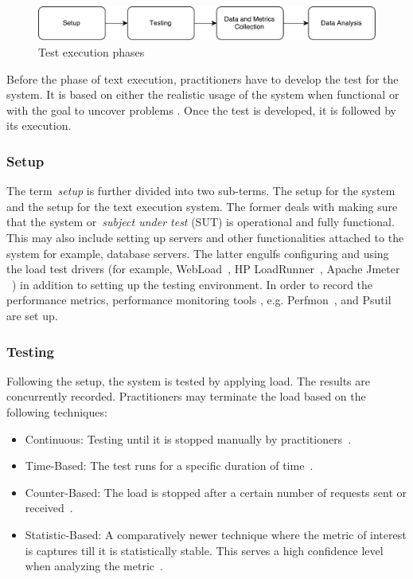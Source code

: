 \begin{figure}[thb!]
	\centering
	\includegraphics[width=1\textwidth]{figures/test_overview.pdf}
	\caption{Test execution phases}
	\label{fig:test_phases}
\end{figure}


Before the phase of text execution, practitioners have to develop the test for the system. It is based on either the realistic usage of the system when functional or with the goal to uncover problems \cite{jiang2015survey}.
Once the test is developed, it is followed by its execution. 



\subsubsection{Setup}


The term~\textit{setup} is further divided into two sub-terms. The setup for the system and the setup for the text execution system. The former deals with making sure that the system or~\textit{subject under test} (SUT) is operational and fully functional. This may also include setting up servers and other functionalities attached to the system for example, database servers. The latter engulfs configuring and using the load test drivers (for example, WebLoad~\cite{webload}, HP LoadRunner~\cite{loadrunner}, Apache Jmeter ~\cite{apachejmeter}) in addition to setting up the testing environment. In order to record the performance metrics, performance monitoring tools , e.g. Perfmon~\cite{perfmon}, and Psutil~\cite{psutil} are set up.

\subsubsection{Testing}

Following the setup, the system is tested by applying load. The results are concurrently recorded. Practitioners may terminate the load based on the following techniques:

\begin{itemize}
	\item Continuous: Testing until it is stopped manually by practitioners~\cite{4017687}.
	\item Time-Based: The test runs for a specific duration of time~\cite{4017687}.
	\item Counter-Based: The load is stopped after a certain number of requests sent or received~\cite{4017687}.
	\item Statistic-Based: A comparatively newer technique where the metric of interest is captures till it is statistically stable. This serves a high confidence level when analyzing the metric~\cite{mansharamani2010performance,snellman2011towards}.
\end{itemize}

